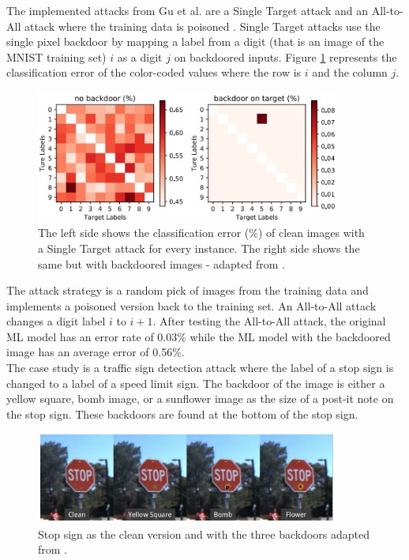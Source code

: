 The implemented attacks from Gu et al. are a Single Target attack and an All-to-All attack where the training data is poisoned \cite{DBLP:conf/ccs/HuangJNRT11}. Single Target attacks use the single pixel backdoor by mapping a label from a digit (that is an image of the MNIST \cite{LeCun1995LearningAF} training set) $i$ as a digit $j$ on backdoored inputs. Figure \ref{fig:mapped_from_i_to_j} represents the classification error of the color-coded values where the row is $i$ and the column $j$.

\begin{figure}[ht!]
  \centering
  \includegraphics[width=10cm]{pictures/mapping_from_i_to_j.jpg}
  \caption{The left side shows the classification error (\%) of clean images with a Single Target attack for every instance. The right side shows the same but with backdoored images - adapted from \cite{DBLP:journals/corr/abs-1708-06733}.}
  \label{fig:mapped_from_i_to_j}
\end{figure}

The attack strategy is a random pick of images from the training data and implements a poisoned version back to the training set. An All-to-All attack changes a digit label $i$ to $i + 1$. After testing the All-to-All attack, the original ML model has an error rate of 0.03\% while the ML model with the backdoored image has an average error of 0.56\%. \\ The case study is a traffic sign detection attack where the label of a stop sign is changed to a label of a speed limit sign. The backdoor of the image is either a yellow square, bomb image, or a sunflower image as the size of a post-it note on the stop sign. These backdoors are found at the bottom of the stop sign.

\begin{figure}[ht!]
  \centering
  \includegraphics[width=10cm]{pictures/stop_sign.jpg}
  \caption{Stop sign as the clean version and with the three backdoors adapted from \cite{DBLP:journals/corr/abs-1708-06733}.}
  \label{fig:stop_sign}
\end{figure}

